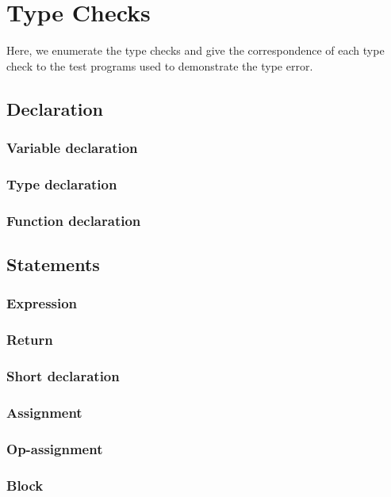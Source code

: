 \documentclass{article}
\begin{document}
\section*{Type Checks}

Here, we enumerate the type checks and give the correspondence of each type check to the test programs used to demonstrate the type error.

\subsection*{Declaration}

\subsubsection*{Variable declaration}
\subsubsection*{Type declaration}
\subsubsection*{Function declaration}

\subsection*{Statements}

\subsubsection*{Expression}
\subsubsection*{Return}
\subsubsection*{Short declaration}
\subsubsection*{Assignment}
\subsubsection*{Op-assignment}
\subsubsection*{Block}
\end{document}
